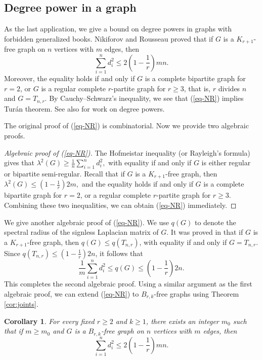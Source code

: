 \documentclass[11pt,a4paper]{article}
\newtheorem{cor}[theorem]{Corollary}
\theoremstyle{definition}
\theoremstyle{remark}
\begin{document}
\subsection{Degree power in a graph}

As the last application, we give a bound on degree powers in graphs with forbidden generalized books. Nikiforov and Rousseau \cite[eq. (4)]{NR2004} proved that if $G$ is a $K_{r+1}$-free graph on $n$ vertices with $m$ edges, then 
\begin{equation}   \label{eq-NR}
\sum_{i=1}^n d_i^2 \le 2\left( 1-\frac{1}{r}\right)mn. 
\end{equation}
Moreover, the equality holds if and only if $G$ is a complete bipartite graph for $r=2$, or  $G$ is a regular complete  $r$-partite graph for $r\ge 3$, that is, $r$ divides $n$ and $G=T_{n,r}$. By Cauchy--Schwarz's inequality, we see that (\ref{eq-NR}) implies Tur\'{a}n theorem. See also \cite{BK2012} for work on degree powers.

The original proof of (\ref{eq-NR}) is combinatorial. 
Now we provide two algebraic proofs. 

\begin{proof}[Algebraic proof of (\ref{eq-NR})]
The Hofmeistar inequality (or Rayleigh's formula) gives that $\lambda^2 (G) \ge \frac{1}{n} \sum_{i=1}^n d_i^2,$
with equality if and only if $G$ is either regular or bipartite semi-regular. Recall that if 
$G$ is a $K_{r+1}$-free graph, then $\lambda^2(G) \le 
\left( 1-\frac{1}{r} \right)2m,$
and the equality holds if and only if 
$G$ is a complete bipartite graph for $r=2$, 
or a regular complete  $r$-partite graph for $r\ge 3$.  
Combining these two inequalities, 
we can obtain (\ref{eq-NR}) immediately. 
\end{proof}


We give another algebraic proof of (\ref{eq-NR}). 
We use $q (G)$ to denote the spectral radius of 
the signless Laplacian matrix of $G$. 
  It was proved in  \cite{HJZ2013} that if 
$G$ is a $K_{r+1}$-free graph, then 
$q(G)\le q(T_{n,r})$, with equality if and only if $G=T_{n,r}$. Since $q(T_{n,r})\le (1- \frac{1}{r})2n$, it follows that   
\[   \frac{1}{m} \sum_{i=1}^n d_i^2 \le q(G)  \le \left( 1-\frac{1}{r} \right)2n.\]  
This completes the second algebraic proof. 
Using a similar argument as the first algebraic proof, we can extend 
(\ref{eq-NR}) to $B_{r,k}$-free graphs using Theorem \ref{cor:joints}. 



\begin{cor}  \label{coro-deg-square}
For every fixed $r\ge 2$ and $k\ge 1$, 
there exists an integer $m_0$ such that 
if $m\ge m_0$ and $G$ is a $B_{r,k}$-free graph on 
$n$ vertices with $m$ edges, then 
\begin{equation*} 
\sum_{i=1}^n d_i^2 \le 2\left( 1-\frac{1}{r}\right)mn.
\end{equation*} 
\end{cor}
\end{document}

